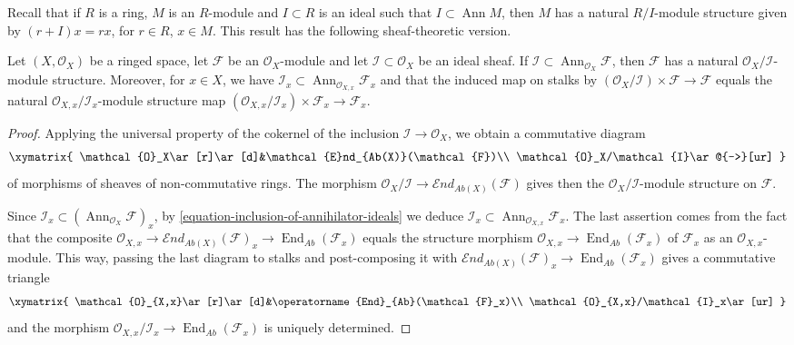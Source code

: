 \noindent
Recall that if $R$ is a ring, $M$ is an $R$-module and $I\subset R$ is an
ideal such that $I\subset\operatorname{Ann}M$,
then $M$ has a natural $R/I$-module structure given by $(r+I)x=rx$,
for $r\in R$, $x\in M$.
This result has the following sheaf-theoretic version.
\begin{lemma}
	Let $(X,\mathcal{O}_X)$ be a ringed space,
	let $\mathcal{F}$ be an $\mathcal{O}_X$-module and let
	$\mathcal{I}\subset\mathcal{O}_X$ be an ideal sheaf.
	If $\mathcal{I}\subset
	\operatorname{Ann}_{\mathcal{O}_X}\mathcal{F}$,
	then $\mathcal{F}$ has a natural
	$\mathcal{O}_X/\mathcal{I}$-module structure.
	Moreover, for $x\in X$, we have
	$\mathcal{I}_x\subset
	\operatorname{Ann}_{\mathcal{O}_{X,x}}\mathcal{F}_x$
	and that the induced map on stalks by
	$(\mathcal{O}_X/\mathcal{I})\times\mathcal{F}\to\mathcal{F}$
	equals the natural $\mathcal{O}_{X,x}/\mathcal{I}_x$-module structure map
	$(\mathcal{O}_{X,x}/\mathcal{I}_x)\times\mathcal{F}_x
	\to\mathcal{F}_x$.
\end{lemma}
\begin{proof}
	Applying the universal property of the cokernel of the inclusion
	$\mathcal{I}\to\mathcal{O}_X$, we obtain a commutative diagram
	$$
	\xymatrix{
		\mathcal{O}_X\ar[r]\ar[d]&\mathcal{E}nd_{Ab(X)}(\mathcal{F})\\
		\mathcal{O}_X/\mathcal{I}\ar@{-->}[ur]
	}
	$$
	of morphisms of sheaves of non-commutative rings.
	The morphism
	$\mathcal{O}_X/\mathcal{I}\to
	\mathcal{E}nd_{Ab(X)}(\mathcal{F})$
	gives then the $\mathcal{O}_X/\mathcal{I}$-module
	structure on $\mathcal{F}$.
	
	\medskip\noindent
	Since
	$\mathcal{I}_x\subset
	(\operatorname{Ann}_{\mathcal{O}_X}\mathcal{F})_x$,
	by \eqref{equation-inclusion-of-annihilator-ideals} we deduce
	$\mathcal{I}_x\subset
	\operatorname{Ann}_{\mathcal{O}_{X,x}}\mathcal{F}_x$.
	The last assertion comes from the fact that the composite
	$\mathcal{O}_{X,x}\to
	\mathcal{E}nd_{Ab(X)}(\mathcal{F})_x\to
	\operatorname{End}_{Ab}(\mathcal{F}_x)$
	equals the structure morphism $\mathcal{O}_{X,x}\to
	\operatorname{End}_{Ab}(\mathcal{F}_x)$
	of $\mathcal{F}_x$ as an $\mathcal{O}_{X,x}$-module.
	This way, passing the last diagram to stalks and post-composing it with
	$\mathcal{E}nd_{Ab(X)}(\mathcal{F})_x\to
	\operatorname{End}_{Ab}(\mathcal{F}_x)$
	gives a commutative triangle
	$$
	\xymatrix{
	\mathcal{O}_{X,x}\ar[r]\ar[d]&\operatorname{End}_{Ab}(\mathcal{F}_x)\\
	\mathcal{O}_{X,x}/\mathcal{I}_x\ar[ur]
	}
	$$
	and the morphism
	$\mathcal{O}_{X,x}/\mathcal{I}_x\to
	\operatorname{End}_{Ab}(\mathcal{F}_x)$
	is uniquely determined.
\end{proof}

